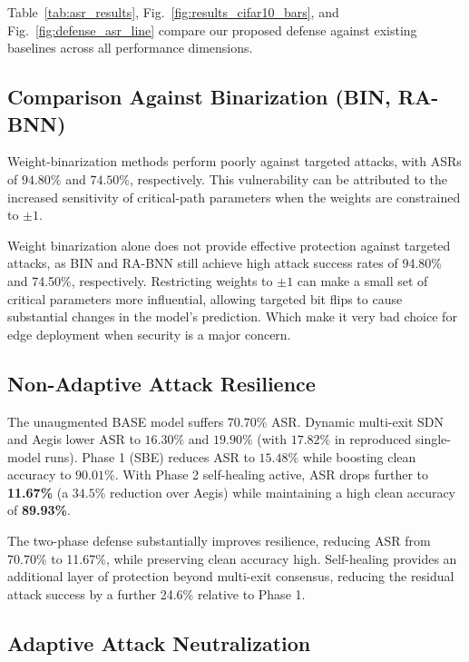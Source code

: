 \documentclass[conference,10pt]{IEEEtran}
\begin{document}
Table~\ref{tab:asr_results}, Fig.~\ref{fig:results_cifar10_bars}, and Fig.~\ref{fig:defense_asr_line} compare our proposed defense against existing baselines across all performance dimensions. 

\subsection{Comparison Against Binarization (BIN, RA-BNN)} 

Weight-binarization methods perform poorly against targeted attacks, with ASRs of $94.80\%$ and $74.50\%$, respectively. This vulnerability can be attributed to the increased sensitivity of critical-path parameters when the weights are constrained to $\pm 1$.  

Weight binarization alone does not provide effective protection against targeted attacks, as BIN and RA-BNN still achieve high attack success rates of 94.80\% and 74.50\%, respectively. Restricting weights to $\pm1$ can make a small set of critical parameters more influential, allowing targeted bit flips to cause substantial changes in the model's prediction. Which make it very bad choice for edge deployment when security is a major concern.
\subsection{Non-Adaptive Attack Resilience} 

The unaugmented BASE model suffers $70.70\%$ ASR. Dynamic multi-exit SDN and Aegis lower ASR to $16.30\%$ and $19.90\%$ (with $17.82\%$ in reproduced single-model runs). Phase 1 (SBE) reduces ASR to $15.48\%$ while boosting clean accuracy to $90.01\%$. With Phase 2 self-healing active, ASR drops further to \textbf{11.67\%} (a $34.5\%$ reduction over Aegis) while maintaining a high clean accuracy of \textbf{89.93\%}.

The two-phase defense substantially improves resilience, reducing ASR from 70.70\% to 11.67\%, while preserving clean accuracy high. Self-healing provides an additional layer of protection beyond multi-exit consensus, reducing the residual attack success by a further 24.6\% relative to Phase 1.
 
 \subsection{ Adaptive Attack Neutralization} 
    
\end{document}
